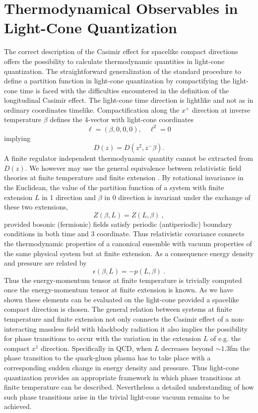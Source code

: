 \documentclass[a4paper,twocolumn,eqsecnum,aps]{revtex4}
\begin{document}

\section{Thermodynamical Observables in Light-Cone Quantization}
The correct description of the Casimir effect for spacelike compact directions offers the possibility to calculate thermodynamic quantities in light-cone quantization. The straightforward generalization of the standard procedure to define a partition function in light-cone quantization by compactifying  the  light-cone time is faced with  the difficulties encountered in the definition of the longitudinal  Casimir effect.  The light-cone time direction is lightlike  and not as in ordinary coordinates timelike. Compactification along the $x^{+}$ direction at inverse temperature $\beta$ defines the 4-vector with light-cone coordinates 
$$\ell=(\beta,0,0,0),\quad \ell^{2}=0$$
implying 
$$D(z)=D(z^2,z^{-}\beta).$$
A finite regulator independent thermodynamic quantity cannot be extracted from $D(z)$. 
We however may use the general equivalence between relativistic field theories at finite temperature and finite extension \cite{lt98,toms}. 
By rotational invariance in the Euclidean, the value of the
partition function of a system with finite extension $L$
in 1 direction and $\beta$  in 0 direction is invariant under the
exchange
of  these two extensions,
\begin{equation}
Z\left(\beta,L\right)=Z\left(L,\beta\right) \ ,
\label{FE1}
\end{equation}
provided bosonic (fermionic) fields satisfy periodic (antiperiodic)
boundary conditions in both time
and 3 coordinate.  Thus relativistic covariance connects the
thermodynamic properties of a canonical ensemble with 
vacuum properties of  the same physical system but at finite extension. As a consequence 
 energy density and pressure are related
by
\begin{equation}
\epsilon\left(\beta,L\right)=-p\left(L,\beta\right) \ .
\label{FE2}
\end{equation}
Thus  the energy-momentum tensor at finite temperature is trivially computed once the
 energy-momentum tensor at finite extension is known. As we have shown these elements can be evaluated on the light-cone provided a spacelike compact direction is chosen. The general relation between systems at finite temperature and finite extension  not only connects the Casimir effect of a non-interacting massless field with blackbody radiation it also implies the possibility for phase transitions to occur with the variation in the extension $L$ of e.g. the compact $x^{1}$ direction. Specifically in QCD,  when $L$ decreases beyond $\sim 1.3 $fm the phase transition to the quark-gluon plasma has to take place with a corresponding sudden change in energy density and pressure. Thus light-cone quantization provides an appropriate framework in which phase transitions at finite temperature can be described. Nevertheless  a detailed understanding of  how  such phase transitions arise in the trivial light-cone vacuum remains to be achieved.
\end{document}
